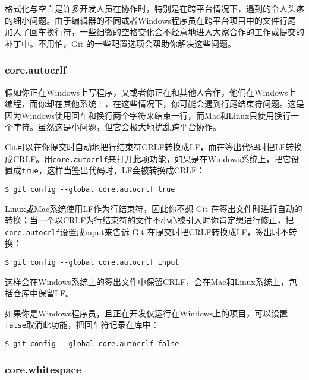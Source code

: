 \documentclass[a4paper]{book}
\begin{document}
格式化与空白是许多开发人员在协作时，特别是在跨平台情况下，遇到的令人头疼的细小问题。由于编辑器的不同或者Windows程序员在跨平台项目中的文件行尾加入了回车换行符，一些细微的空格变化会不经意地进入大家合作的工作或提交的补丁中。不用怕，Git 的一些配置选项会帮助你解决这些问题。

\subsubsection{core.autocrlf}

假如你正在Windows上写程序，又或者你正在和其他人合作，他们在Windows上编程，而你却在其他系统上，在这些情况下，你可能会遇到行尾结束符问题。这是因为Windows使用回车和换行两个字符来结束一行，而Mac和Linux只使用换行一个字符。虽然这是小问题，但它会极大地扰乱跨平台协作。

Git可以在你提交时自动地把行结束符CRLF转换成LF，而在签出代码时把LF转换成CRLF。用\texttt{core.autocrlf}来打开此项功能，如果是在Windows系统上，把它设置成\texttt{true}，这样当签出代码时，LF会被转换成CRLF：

\begin{shaded}\begin{verbatim}
$ git config --global core.autocrlf true
\end{verbatim}\end{shaded}

Linux或Mac系统使用LF作为行结束符，因此你不想 Git 在签出文件时进行自动的转换；当一个以CRLF为行结束符的文件不小心被引入时你肯定想进行修正，把\texttt{core.autocrlf}设置成input来告诉 Git 在提交时把CRLF转换成LF，签出时不转换：

\begin{shaded}\begin{verbatim}
$ git config --global core.autocrlf input
\end{verbatim}\end{shaded}

这样会在Windows系统上的签出文件中保留CRLF，会在Mac和Linux系统上，包括仓库中保留LF。

如果你是Windows程序员，且正在开发仅运行在Windows上的项目，可以设置\texttt{false}取消此功能，把回车符记录在库中：

\begin{shaded}\begin{verbatim}
$ git config --global core.autocrlf false
\end{verbatim}\end{shaded}

\subsubsection{core.whitespace}
\end{document}
